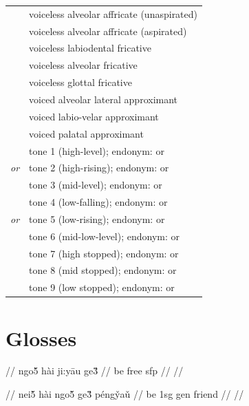 \documentclass{article}
\begin{document}
\begin{xltabular}{\textwidth}{lL}
   & voiceless alveolar affricate (unaspirated) \\
   & voiceless alveolar affricate (aspirated) \\
   & voiceless labiodental fricative \\
   & voiceless alveolar fricative \\
   & voiceless glottal fricative \\
   & voiced alveolar lateral approximant \\
   & voiced labio-velar approximant \\
   & voiced palatal approximant \\
   & tone 1 (high-level); endonym:  or  \\
   \textit{or}  & tone 2 (high-rising); endonym:  or  \\
   & tone 3 (mid-level); endonym:  or  \\
   & tone 4 (low-falling); endonym:  or  \\
   \textit{or}  & tone 5 (low-rising); endonym:  or  \\
   & tone 6 (mid-low-level); endonym:  or  \\
   & tone 7 (high stopped); endonym:  or  \\
   & tone 8 (mid stopped); endonym:  or  \\
   & tone 9 (low stopped); endonym:  or  \\
\end{xltabular}

\newpage\section{Glosses}

\ex
\begingl
\gla {}    //
\glb ngo\v{5} h\`ai ji:y\={a}u ge\v{3} //
 be free {\sc sfp} //
 //
\endgl
\xe

\ex
\begingl
\gla {}     //
\glb nei\v{5} h\`ai ngo\v{5} ge\v{3} p\'{e}ng\v{y}a\v{u} //
 be {\sc 1sg} {\sc gen} friend //
 //
\endgl
\xe
\end{document}
